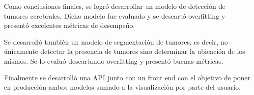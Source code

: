 Como conclusiones finales, se logró desarrollar un modelo de detección de tumores cerebrales. Dicho modelo fue evaluado y se descartó overfitting y presentó excelentes métricas de desempeño.

Se desarrolló también un modelo de segmentación de tumores, es decir, no únicamente detectar la presencia de tumores sino determinar la ubicación de los mismos. Se lo evaluó descartando overfitting y presentó buenas métricas.

Finalmente se desarrolló una API junto con un front end con el objetivo de poner en producción ambos modelos sumado a la visualización por parte del usuario. 


